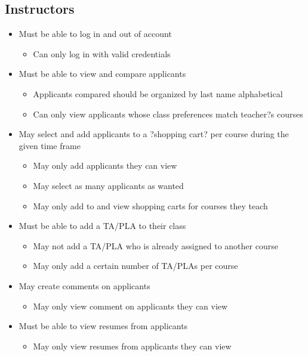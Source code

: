 \documentclass[11pt]{amsart}
\begin{document}
\subsection{Instructors}

\begin{itemize}

\item{Must be able to log in and out of account}
\begin{itemize}
\item{Can only log in with valid credentials}
\end{itemize}

\item{Must be able to view and compare applicants}
\begin{itemize}
\item{Applicants compared should be organized by last name alphabetical}
\item{Can only view applicants whose class preferences match teacher?s courses}
\end{itemize}

\item{May select and add applicants to a ?shopping cart? per course during the given time frame}
\begin{itemize}
\item{May only add applicants they can view}
\item{May select as many applicants as wanted}
\item{May only add to and view shopping carts for courses they teach}
\end{itemize}

\item{Must be able to add a TA/PLA to their class}
\begin{itemize}
\item{May not add a TA/PLA who is already assigned to another course}
\item{May only add a certain number of TA/PLAs per course}
\end{itemize}

\item{May create comments on applicants}
\begin{itemize}
\item{May only view comment on applicants they can view}
\end{itemize}

\item{Must be able to view resumes from applicants}
\begin{itemize}
\item{May only view resumes from applicants they can view}
\end{itemize}

\end{itemize}
\end{document}
